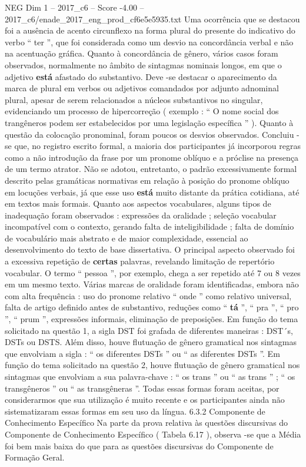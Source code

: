 \begin{textsample}{NEG Dim 1 – 2017\_c6 – Score -4.00 – 2017\_c6/enade\_2017\_eng\_prod\_cf6e5e5935.txt}
Uma ocorrência que se destacou foi a ausência de acento circunflexo na forma plural do presente do indicativo do verbo “ ter ”, que foi considerada como um desvio na concordância verbal e não na acentuação gráfica.
Quanto à concordância de gênero, vários casos foram observados, normalmente no âmbito de sintagmas nominais longos, em que o adjetivo \textbf{está} afastado do substantivo.
Deve -se destacar o aparecimento da marca de plural em verbos ou adjetivos comandados por adjunto adnominal plural, apesar de serem relacionados a núcleos substantivos no singular, evidenciando um processo de hipercorreção ( exemplo : “ O nome social dos trangêneros podem ser estabelecidos por uma legislação específica ” ).
Quanto à questão da colocação pronominal, foram poucos os desvios observados.
Concluiu -se que, no registro escrito formal, a maioria dos participantes já incorporou regras como a não introdução da frase por um pronome oblíquo e a próclise na presença de um termo atrator.
Não se adotou, entretanto, o padrão excessivamente formal descrito pelas gramáticas normativas em relação à posição do pronome oblíquo em locuções verbais, já que esse uso \textbf{está} muito distante da prática cotidiana, até em textos mais formais.
Quanto aos aspectos vocabulares, alguns tipos de inadequação foram observados : expressões da oralidade ; seleção vocabular incompatível com o contexto, gerando falta de inteligibilidade ; falta de domínio de vocabulário mais abstrato e de maior complexidade, essencial ao desenvolvimento do texto de base dissertativa.
O principal aspecto observado foi a excessiva repetição de \textbf{certas} palavras, revelando limitação de repertório vocabular.
O termo “ pessoa ”, por exemplo, chega a ser repetido até 7 ou 8 vezes em um mesmo texto.
Várias marcas de oralidade foram identificadas, embora não com alta frequência : uso do pronome relativo “ onde ” como relativo universal, falta de artigo definido antes de substantivo, reduções como “ \textbf{tá} ”, “ pra ”, “ pro ”, “ prum ”, expressões informais, eliminação de preposições.
Em função do tema solicitado na questão 1, a sigla DST foi grafada de diferentes maneiras : DST´s, DSTs ou DSTS.
Além disso, houve flutuação de gênero gramatical nos sintagmas que envolviam a sigla : “ os diferentes DSTs ” ou “ as diferentes DSTs ”.
Em função do tema solicitado na questão 2, houve flutuação de gênero gramatical nos sintagmas que envolviam a sua palavra-chave : “ os trans ” ou “ as trans ” ; “ os transgêneros ” ou “ as transgêneras ”.
Todas essas formas foram aceitas, por considerarmos que sua utilização é muito recente e os participantes ainda não sistematizaram essas formas em seu uso da língua. 6.3.2 Componente de Conhecimento Específico Na parte da prova relativa às questões discursivas do Componente de Conhecimento Específico ( Tabela 6.17 ), observa -se que a Média foi bem mais baixa do que para as questões discursivas do Componente de Formação Geral.

\end{textsample}
